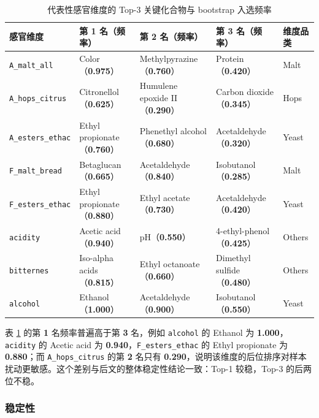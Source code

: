 \begin{table}[H]
\centering
{}
\setlength{\tabcolsep}{4pt}
\begin{tabularx}{\textwidth}{@{}p{}p{}p{}p{}p{}@{}}
\toprule
感官维度 & 第 \textbf{1} 名（频率） & 第 \textbf{2} 名（频率） & 第 \textbf{3} 名（频率） & 维度品类 \\
\midrule
\texttt{A\_malt\_all} & Color（\textbf{0.975}） & Methylpyrazine（\textbf{0.760}） & Protein（\textbf{0.420}） & Malt \\
\texttt{A\_hops\_citrus} & Citronellol（\textbf{0.625}） & Humulene epoxide II（\textbf{0.290}） & Carbon dioxide（\textbf{0.345}） & Hops \\
\texttt{A\_esters\_ethac} & Ethyl propionate（\textbf{0.760}） & Phenethyl alcohol（\textbf{0.680}） & Acetaldehyde（\textbf{0.320}） & Yeast \\
\texttt{F\_malt\_bread} & Betaglucan（\textbf{0.665}） & Acetaldehyde（\textbf{0.840}） & Isobutanol（\textbf{0.285}） & Malt \\
\texttt{F\_esters\_ethac} & Ethyl propionate（\textbf{0.880}） & Ethyl acetate（\textbf{0.730}） & Acetaldehyde（\textbf{0.420}） & Yeast \\
\texttt{acidity} & Acetic acid（\textbf{0.940}） & pH（\textbf{0.550}） & 4-ethyl-phenol（\textbf{0.425}） & Others \\
\texttt{bitternes} & Iso-alpha acids（\textbf{0.815}） & Ethyl octanoate（\textbf{0.660}） & Dimethyl sulfide（\textbf{0.480}） & Others \\
\texttt{alcohol} & Ethanol（\textbf{1.000}） & Acetaldehyde（\textbf{0.900}） & Isobutanol（\textbf{0.550}） & Yeast \\
\bottomrule
\end{tabularx}
\caption{代表性感官维度的 Top-3 关键化合物与 bootstrap 入选频率}
\label{tab:q2-top3}
\end{table}

表 \ref{tab:q2-top3} 的第 \textbf{1} 名频率普遍高于第 \textbf{3} 名，例如 \texttt{alcohol} 的 Ethanol 为 \textbf{1.000}，\texttt{acidity} 的 Acetic acid 为 \textbf{0.940}，\texttt{F\_esters\_ethac} 的 Ethyl propionate 为 \textbf{0.880}；而 \texttt{A\_hops\_citrus} 的第 \textbf{2} 名只有 \textbf{0.290}，说明该维度的后位排序对样本扰动更敏感。这个差别与后文的整体稳定性结论一致：Top-1 较稳，Top-3 的后两位不稳。

\subsubsection{稳定性}

